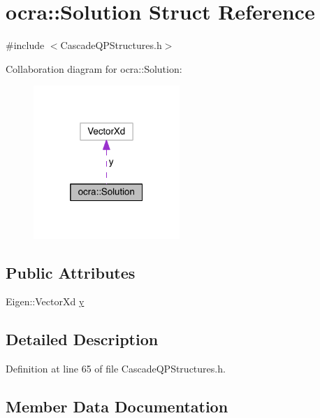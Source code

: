 \hypertarget{structocra_1_1Solution}{}\section{ocra\+:\+:Solution Struct Reference}
\label{structocra_1_1Solution}


{\ttfamily \#include $<$Cascade\+Q\+P\+Structures.\+h$>$}



Collaboration diagram for ocra\+:\+:Solution\+:\nopagebreak
\begin{figure}[H]
\begin{center}
\leavevmode
\includegraphics[width=157pt]{da/d1c/structocra_1_1Solution__coll__graph}
\end{center}
\end{figure}
\subsection*{Public Attributes}
\begin{DoxyCompactItemize}
\item 
Eigen\+::\+Vector\+Xd \hyperlink{structocra_1_1Solution_a1b80abc6ec96a3245cf3813c20f417f9}{y}
\end{DoxyCompactItemize}


\subsection{Detailed Description}


Definition at line 65 of file Cascade\+Q\+P\+Structures.\+h.



\subsection{Member Data Documentation}
\hypertarget{structocra_1_1Solution_a1b80abc6ec96a3245cf3813c20f417f9}{}\label{structocra_1_1Solution_a1b80abc6ec96a3245cf3813c20f417f9} 
